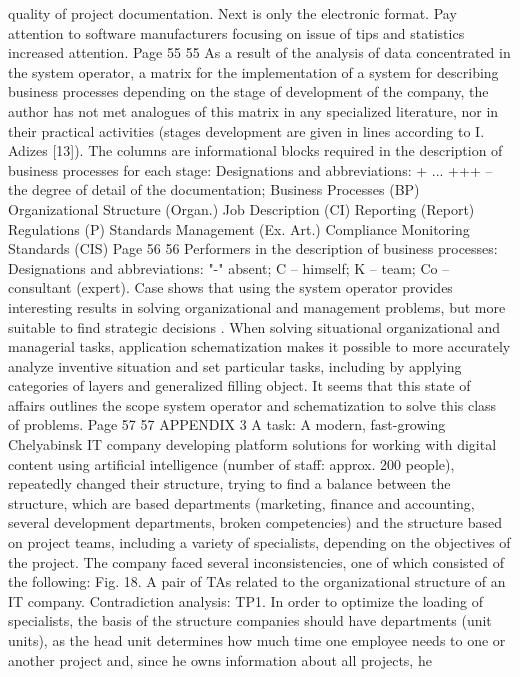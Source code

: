 quality of project documentation. Next is only the electronic format.
Pay attention to software manufacturers focusing on
issue of tips and statistics increased attention.
Page 55
55
As a result of the analysis of data concentrated in the system operator,
a matrix for the implementation of a system for describing business processes depending on
the stage of development of the company, the author has not met analogues of this matrix in any
specialized literature, nor in their practical activities (stages
development are given in lines according to I. Adizes [13]). The columns are informational
blocks required in the description of business processes for each stage:
Designations and abbreviations:
+ ... +++ -- the degree of detail of the documentation;
Business Processes (BP)
Organizational Structure (Organ.)
Job Description (CI)
Reporting (Report)
Regulations (P)
Standards Management (Ex. Art.)
Compliance Monitoring Standards (CIS)
Page 56
56
Performers in the description of business processes:
Designations and abbreviations:
"-" absent;
C -- himself;
K -- team;
Co -- consultant (expert).
Case shows that using the system operator provides interesting
results in solving organizational and management problems, but more suitable
to find strategic decisions .
When solving situational organizational and managerial tasks, application
schematization makes it possible to more accurately analyze inventive
situation and set particular tasks, including by applying categories of layers and
generalized filling object.
It seems that this state of affairs outlines the scope
system operator and schematization to solve this class of problems.
Page 57
57
APPENDIX 3
A task:
A modern, fast-growing Chelyabinsk IT company developing
platform solutions for working with digital content using
artificial intelligence (number of staff: approx. 200 people), repeatedly changed
their structure, trying to find a balance between the structure, which are based
departments (marketing, finance and accounting, several development departments, broken
competencies) and the structure based on project teams,
including a variety of specialists, depending on the objectives of the project.
The company faced several inconsistencies, one of which
consisted of the following:
Fig. 18. A pair of TAs related to the organizational structure of an IT company.
Contradiction analysis:
TP1. In order to optimize the loading of specialists, the basis of the structure
companies should have departments (unit units), as the head
unit determines how much time one employee needs to
one or another project and, since he owns information about all projects, he
